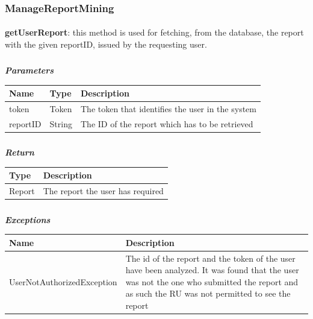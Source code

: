 				\subsubsection{ManageReportMining}
					\paragraph{}
							\textbf{getUserReport}: this method is used for fetching, from the database, the report with the given reportID, issued by the requesting user.
							\subparagraph{}
							\textit{\textbf{Parameters}}
								\begin{table}[!h]
									\begin{tabular}{L{0.2\textwidth}L{0.2\textwidth}L{0.2\textwidth}}
										\toprule
										Name & Type & Description \\
										\midrule
								  		token & Token & The token that identifies the user in the system \\
								  		reportID & String & The ID of the report which has to be retrieved \\
								 		\bottomrule
									\end{tabular}
								\end{table}
							\subparagraph{}
								\textit{\textbf{Return}}
									\begin{table}[!h]
									\begin{tabular}{L{0.3\textwidth}L{0.3\textwidth}}
										\toprule
										Type & Description \\
										\midrule
								  		Report & The report the user has required \\
								 		\bottomrule
									\end{tabular}
								\end{table}
							\subparagraph{}
								\textit{\textbf{Exceptions}}
									\begin{table}[!h]
									\begin{tabular}{L{0.3\textwidth}L{0.3\textwidth}}
										\toprule
										Name & Description \\
										\midrule
								  	UserNotAuthorizedException & The id of the report and the token of the user have been analyzed. It was found that the user was not the one who submitted the report and as such the RU was not permitted to see the report  \\
								 		\bottomrule
									\end{tabular}
								\end{table}
								
